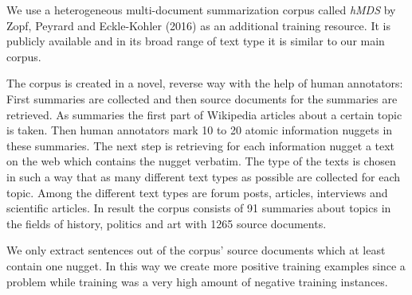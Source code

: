 We use a heterogeneous multi-document summarization corpus called \textit{hMDS} by Zopf, Peyrard and Eckle-Kohler (2016) \citep{tubiblio97941} as an additional training resource. It is publicly available and in its broad range of text type it is similar to our main corpus.

The corpus is created in a novel, reverse way with the help of human annotators: First summaries are collected and then source documents for the summaries are retrieved. As summaries the first part of Wikipedia articles about a certain topic is taken. Then human annotators mark 10 to 20 atomic information nuggets in these summaries. The next step is retrieving for each information nugget a text on the web which contains the nugget verbatim. The type of the texts is chosen in such a way that as many different text types as possible are collected for each topic. Among the different text types are forum posts, articles, interviews and scientific articles. In result the corpus consists of 91 summaries about topics in the fields of history, politics and art with 1265 source documents.

We only extract sentences out of the corpus' source documents which at least contain one nugget. In this way we create more positive training examples since a problem while training was a very high amount of negative training instances.
